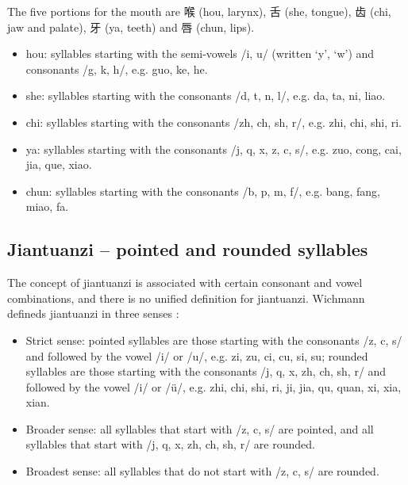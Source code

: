 The five portions for the mouth are 喉 (hou, larynx), 舌 (she, tongue), 齿 (chi, jaw and palate), 牙 (ya, teeth) and 唇 (chun, lips).
\begin{itemize}
\item hou: syllables starting with the semi-vowels /i, u/ (written `y', `w') and consonants /g, k, h/, e.g. guo, ke, he.
\item she: syllables starting with the consonants /d, t, n, l/, e.g. da, ta, ni, liao.
\item chi: syllables starting with the consonants /zh, ch, sh, r/, e.g. zhi, chi, shi, ri.
\item ya: syllables starting with the consonants /j, q, x, z, c, s/, e.g. zuo, cong, cai, jia, que, xiao.
\item chun: syllables starting with the consonants /b, p, m, f/, e.g. bang, fang, miao, fa.
\end{itemize}

\subsection{Jiantuanzi -- pointed and rounded syllables}

The concept of jiantuanzi is associated with certain consonant and vowel combinations, and there is no unified definition for jiantuanzi. Wichmann defineds jiantuanzi in three senses \cite{Wichmann1991a}:
\begin{itemize}
\item Strict sense: pointed syllables are those starting with the consonants /z, c, s/ and followed by the vowel /i/ or /u/, e.g. zi, zu, ci, cu, si, su; rounded syllables are those starting with the consonants /j, q, x, zh, ch, sh, r/ and followed by the vowel /i/ or /ü/, e.g. zhi, chi, shi, ri, ji, jia, qu, quan, xi, xia, xian.
\item Broader sense: all syllables that start with /z, c, s/ are pointed, and all syllables that start with /j, q, x, zh, ch, sh, r/ are rounded.
\item Broadest sense: all syllables that do not start with /z, c, s/ are rounded.
\end{itemize}

